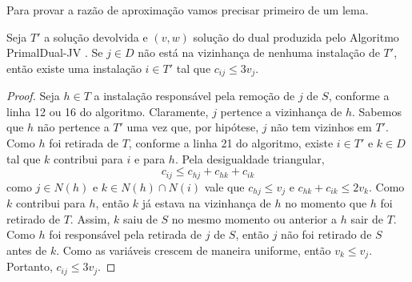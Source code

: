 Para provar a razão de aproximação vamos precisar primeiro de um lema.
\begin{lemma}
    \label{lemma:3.9}
    Seja $T'$ a solução devolvida e $(v,w)$ solução do dual produzida pelo Algoritmo {\sc PrimalDual-JV }. Se $j \in D$ não está na vizinhança de nenhuma instalação de $T'$, então existe uma instalação $i \in T'$ tal que $c_{ij} \leq 3v_j$.
\end{lemma}
\begin{proof}
    Seja $h \in T$ a instalação responsável pela remoção de $j$ de $S$, conforme a linha 12 ou 16 do algoritmo. Claramente, $j$ pertence a vizinhança de $h$. Sabemos que $h$ não pertence a $T'$ uma vez que, por hipótese, $j$ não tem vizinhos em $T'$. Como $h$ foi retirada de $T$, conforme a linha 21 do algoritmo, existe $i \in T'$ e $k \in D$ tal que $k$ contribui para $i$ e para $h$. Pela desigualdade triangular,
    \[c_{ij} \leq c_{hj} + c_{hk} + c_{ik}\]
    como $j \in N(h)$ e $k \in N(h) \cap N(i)$ vale que $c_{hj} \leq v_j$ e $c_{hk} + c_{ik} \leq 2v_k$. Como $k$ contribui para $h$, então $k$ já estava na vizinhança de $h$ no momento que $h$ foi retirado de $T$. Assim, $k$ saiu de $S$ no mesmo momento ou anterior a $h$ sair de $T$. Como $h$ foi responsável pela retirada de $j$ de $S$, então $j$ não foi retirado de $S$ antes de $k$. Como as variáveis crescem de maneira uniforme, então $v_k \leq v_j$. 
    Portanto, $c_{ij}\leq 3v_j$. 
\end{proof}

